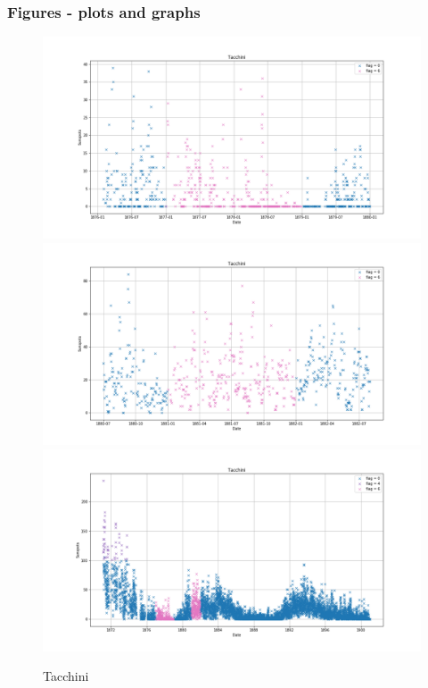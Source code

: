 \documentclass[12pt]{article}
\begin{document}
\newpage{}

\subsubsection{Figures - plots and graphs}

\begin{figure}[H]
    \includegraphics[width=0.5\linewidth]{tacchini1877_patch.png}
    \includegraphics[width=0.5\linewidth]{tacchini1881_patch.png}
    \includegraphics[width=\linewidth]{tacchini_pached.png}
    \caption{Tacchini}
    \label{fig:tacchini}
\end{figure}
\end{document}
